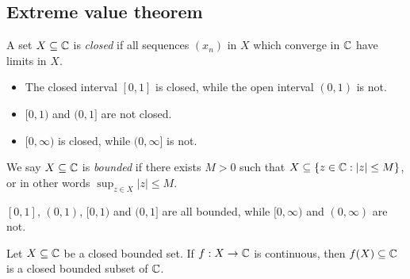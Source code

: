 \documentclass{../template/note}
\begin{document}
    \subsection{Extreme value theorem}

    \begin{definition}
        A set \(X \subseteq \mathbb C\) is \emph{closed} if all sequences \((x_n)\) in \(X\) which converge in \(\mathbb C\) have limits in \(X\).
    \end{definition}
    
    \begin{example*}
        \begin{itemize}
            \item The closed interval \([0, 1]\) is closed, while the open interval \((0, 1)\) is not.
            \item \([0, 1)\) and \((0, 1]\) are not closed.
            \item \([0, \infty)\) is closed, while \((0, \infty]\) is not.
        \end{itemize}
    \end{example*}

    \begin{definition}
        We say \(X \subseteq \mathbb C\) is \emph{bounded} if there exists \(M > 0\) such that \(X \subseteq \{z \in \mathbb C: |z| \leq M\}\), or in other words \(\sup_{z \in X} |z| \leq M\).
    \end{definition}
    
    \begin{example*}
        \([0, 1]\), \((0, 1)\), \([0, 1)\) and \((0, 1]\) are all bounded, while \([0, \infty)\) and \((0, \infty)\) are not.
    \end{example*}
    
    \begin{proposition}
        \label{cts-preserves-cbdd}
        Let \(X \subseteq \mathbb C\) be a closed bounded set. If \(f: X \to \mathbb C\) is continuous, then \(f(X) \subseteq \mathbb C\) is a closed bounded subset of \(\mathbb C\).
    \end{proposition}
\end{document}
